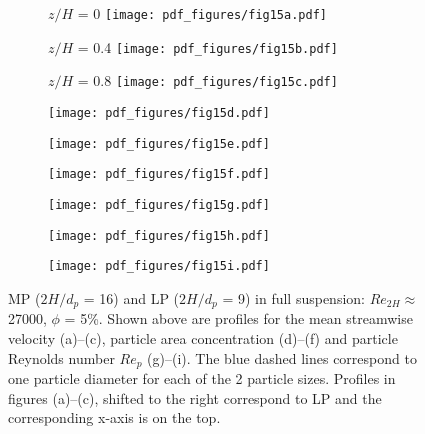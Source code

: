 \documentclass{jfm}
\begin{document}
\begin{figure}
\centering

\begin{subfigure}{.32\textwidth}
  \centering
  $z/H$ = 0
  \texttt{[image: pdf\_figures/fig15a.pdf]}
  \caption{}
  \label{fig:3_6mm_5p_Re27000_sp00mm_Umean}
\end{subfigure}%
\begin{subfigure}{.32\textwidth}
  \centering
  $z/H$ = 0.4
  \texttt{[image: pdf\_figures/fig15b.pdf]}
  \caption{}
  \label{fig:3_6mm_5p_Re27000_sp10mm_Umean}
\end{subfigure}
\begin{subfigure}{.32\textwidth}
  \centering
  $z/H$ = 0.8
  \texttt{[image: pdf\_figures/fig15c.pdf]}
  \caption{}
  \label{fig:3_6mm_5p_Re27000_sp20mm_Umean}
\end{subfigure}

\begin{subfigure}{.32\textwidth}
  \centering
  \texttt{[image: pdf\_figures/fig15d.pdf]}
  \caption{}
  \label{fig:3_6mm_5p_Re27000_sp00mm_phi}
\end{subfigure}%
\begin{subfigure}{.32\textwidth}
  \centering
  \texttt{[image: pdf\_figures/fig15e.pdf]}
  \caption{}
  \label{fig:3_6mm_5p_Re27000_sp10mm_phi}
\end{subfigure}
\begin{subfigure}{.32\textwidth}
  \centering
  \texttt{[image: pdf\_figures/fig15f.pdf]}
  \caption{}
  \label{fig:3_6mm_5p_Re27000_sp20mm_phi}
\end{subfigure}

\begin{subfigure}{.32\textwidth}
  \centering
  \texttt{[image: pdf\_figures/fig15g.pdf]}
  \caption{}
  \label{fig:3_6mm_5p_Re27000_sp00mm_Rep}
\end{subfigure}%
\begin{subfigure}{.32\textwidth}
  \centering
  \texttt{[image: pdf\_figures/fig15h.pdf]}
  \caption{}
  \label{fig:3_6mm_5p_Re27000_sp10mm_Rep}
\end{subfigure}
\begin{subfigure}{.32\textwidth}
  \centering
  \texttt{[image: pdf\_figures/fig15i.pdf]}
  \caption{}
  \label{fig:3_6mm_5p_Re27000_sp20mm_Rep}
\end{subfigure}

\caption{MP ($2H/d_p$ = 16) and LP ($2H/d_p$ = 9) in full suspension: $Re_{2H}\approx$ 27000, $\phi$ = 5\%. Shown above are profiles for the mean streamwise velocity (a)--(c), particle area concentration (d)--(f) and particle Reynolds number $Re_p$ (g)--(i). The blue dashed lines correspond to one particle diameter for each of the 2 particle sizes. Profiles in figures (a)--(c), shifted to the right correspond to LP and the corresponding x-axis is on the top.}
\label{fig:3_6mm_5p_Re27000_Umean_phi_Rep}
\end{figure}
\end{document}
